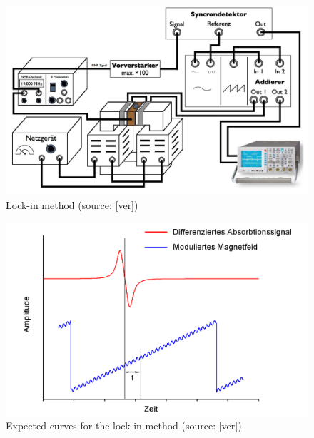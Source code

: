\begin{figure}[htbp]
\begin{center}
\includegraphics [scale=0.4]{Bilder/lockin.png}
\caption{Lock-in method (source: [ver])}
\end{center}
\end{figure}
\begin{figure}[htbp]
\begin{center}
\includegraphics [scale=0.4]{Bilder/theoverlauf2.png}
\caption{Expected curves for the lock-in method (source: [ver])}
\end{center}
\end{figure}
\clearpage
